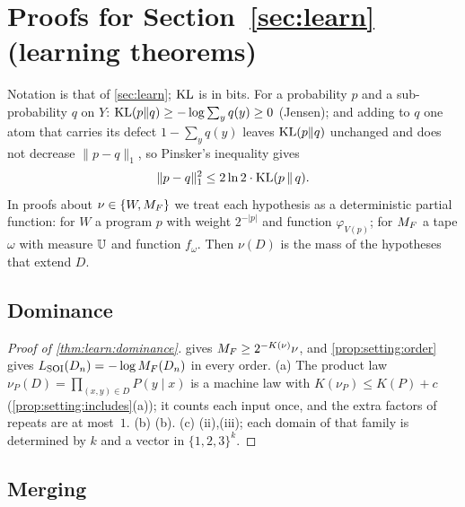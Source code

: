 \section{Proofs for Section~\ref{sec:learn} (learning theorems)}\label{app:learn}

Notation is that of \cref{sec:learn}; $\operatorname{KL}$ is in bits. For a probability $p$ and a sub-probability $q$ on $Y$: $\operatorname{KL}(p\|q)\ge-\log\sum_yq(y)\ge0$ (Jensen); and adding to $q$ one atom that carries its defect $1-\sum_yq(y)$ leaves $\operatorname{KL}(p\|q)$ unchanged and does not decrease $\|p-q\|_1$, so Pinsker's inequality gives
\begin{equation}\label{eq:learn:pinsker}
\|p-q\|_1^2\le2\ln2\cdot\operatorname{KL}(p\,\|\,q).
\end{equation}
In proofs about $\nu\in\{W,M_{F}\}$ we treat each hypothesis as a deterministic partial function: for $W$ a program $p$ with weight $2^{-|p|}$ and function $\varphi_{V(p)}$; for $M_{F}$ a tape $\omega$ with measure $\mathbb{U}$ and function $f_\omega$. Then $\nu(D)$ is the mass of the hypotheses that extend $D$.

\subsection{Dominance}\label{app:learn:dominance}

\begin{proof}[Proof of \cref{thm:learn:dominance}]
 gives $M_{F}\ge2^{-K(\nu)}\nu$, and \cref{prop:setting:order} gives $L_{\mathrm{SOI}}(D_n)=-\log M_{F}(D_n)$ in every order. (a) The product law $\nu_P(D)=\prod_{(x,y)\in D}P(y\mid x)$ is a machine law with $K(\nu_P)\le K(P)+c$ (\cref{prop:setting:includes}(a)); it counts each input once, and the extra factors of repeats are at most~$1$. (b) (b). (c) (ii),(iii); each domain of that family is determined by $k$ and a vector in $\{1,2,3\}^k$.
\end{proof}

\subsection{Merging}\label{app:learn:merging}

